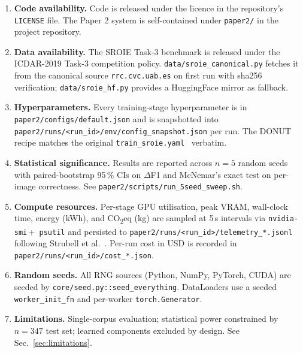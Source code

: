 
\begin{enumerate}
\item \textbf{Code availability.}  Code is released under the licence
in the repository's \texttt{LICENSE} file.  The Paper 2 system is
self-contained under \texttt{paper2/} in the project repository.

\item \textbf{Data availability.}  The SROIE Task-3 benchmark is
released under the ICDAR-2019 Task-3 competition policy.
\texttt{data/sroie\_canonical.py} fetches it from the canonical
source \texttt{rrc.cvc.uab.es} on first run with sha256 verification;
\texttt{data/sroie\_hf.py} provides a HuggingFace mirror as fallback.

\item \textbf{Hyperparameters.}  Every training-stage hyperparameter
is in \texttt{paper2/configs/default.json} and is snapshotted into
\texttt{paper2/runs/<run\_id>/env/config\_snapshot.json} per run.
The DONUT recipe matches the original
\texttt{train\_sroie.yaml}~\cite{kim2022donut} verbatim.

\item \textbf{Statistical significance.}  Results are reported across
$n=5$ random seeds with paired-bootstrap 95\,\% CIs on $\Delta$F1
and McNemar's exact test on per-image correctness.  See
\texttt{paper2/scripts/run\_5seed\_sweep.sh}.

\item \textbf{Compute resources.}  Per-stage GPU utilisation, peak
VRAM, wall-clock time, energy (kWh), and CO\textsubscript{2}eq (kg)
are sampled at 5\,s intervals via \texttt{nvidia-smi}\,+\,
\texttt{psutil} and persisted to
\texttt{paper2/runs/<run\_id>/telemetry\_*.jsonl} following Strubell
et al.~\cite{strubell2019energy}.  Per-run cost in USD is recorded
in \texttt{paper2/runs/<run\_id>/cost\_*.json}.

\item \textbf{Random seeds.}  All RNG sources (Python, NumPy, PyTorch,
CUDA) are seeded by \texttt{core/seed.py::seed\_everything}.
DataLoaders use a seeded \texttt{worker\_init\_fn} and per-worker
\texttt{torch.Generator}.

\item \textbf{Limitations.}  Single-corpus evaluation; statistical
power constrained by $n=347$ test set; learned components excluded
by design.  See Sec.~\ref{sec:limitations}.
\end{enumerate}
